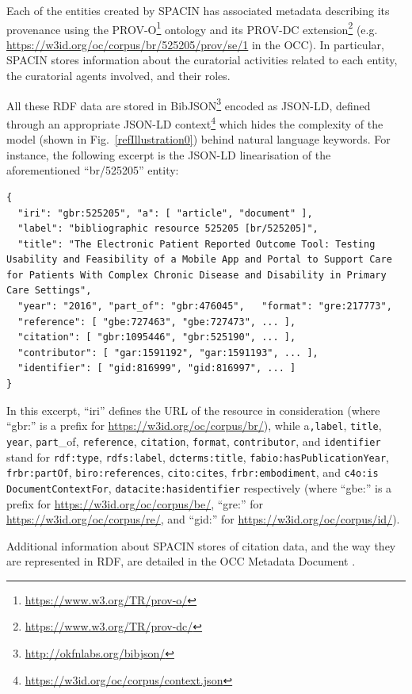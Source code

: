 \documentclass[runningheads,a4paper]{llncs}
\begin{document}
Each of the entities created by SPACIN has associated metadata describing its provenance using the PROV-O\footnote{\url{https://www.w3.org/TR/prov-o/}} ontology and its PROV-DC extension\footnote{\url{https://www.w3.org/TR/prov-dc/}} (e.g. \url{https://w3id.org/oc/corpus/br/525205/prov/se/1} in the OCC). In particular, SPACIN stores information about the curatorial activities related to each entity, the curatorial agents involved, and their roles. 

All these RDF data are stored in BibJSON\footnote{\url{http://okfnlabs.org/bibjson/}} encoded as JSON-LD, defined through an appropriate JSON-LD context\footnote{\url{https://w3id.org/oc/corpus/context.json}} which hides the complexity of the model (shown in Fig.~\ref{refIllustration0}) behind natural language keywords. For instance, the following excerpt is the JSON-LD linearisation of the aforementioned ``br/525205'' entity:

\begin{lstlisting}[mathescape]
{
  "iri": "gbr:525205", "a": [ "article", "document" ], 
  "label": "bibliographic resource 525205 [br/525205]", 
  "title": "The Electronic Patient Reported Outcome Tool: Testing Usability and Feasibility of a Mobile App and Portal to Support Care for Patients With Complex Chronic Disease and Disability in Primary Care Settings", 
  "year": "2016", "part_of": "gbr:476045",   "format": "gre:217773", 
  "reference": [ "gbe:727463", "gbe:727473", ... ], 
  "citation": [ "gbr:1095446", "gbr:525190", ... ], 
  "contributor": [ "gar:1591192", "gar:1591193", ... ], 
  "identifier": [ "gid:816999", "gid:816997", ... ]
}
\end{lstlisting}

In this excerpt, ``iri'' defines the URL of the resource in consideration (where ``gbr:'' is a prefix for \url{https://w3id.org/oc/corpus/br/}), while a\Verb+,+\Verb+label+, \Verb+title+, \Verb+year+, \Verb+part+\_of, \Verb+reference+, \Verb+citation+, \Verb+format+, \Verb+contributor+, and \Verb+identifier+ stand for \Verb+rdf:type+, \Verb+rdfs:label+, \Verb+dcterms:title+, \Verb+fabio:hasPublicationYear+, \Verb+frbr:partOf+, \Verb+biro:references+, \Verb+cito:cites+, \Verb+frbr:embodiment+, and \Verb+c4o:is+ \Verb+DocumentContextFor+, \Verb+datacite:hasidentifier+ respectively (where ``gbe:'' is a prefix for \url{https://w3id.org/oc/corpus/be/}, ``gre:'' for \url{https://w3id.org/oc/corpus/re/}, and ``gid:'' for \url{https://w3id.org/oc/corpus/id/}).

Additional information about SPACIN stores of citation data, and the way they are represented in RDF, are detailed in the OCC Metadata Document  \cite{__RefNumPara__14748_1591320820}.
\end{document}
